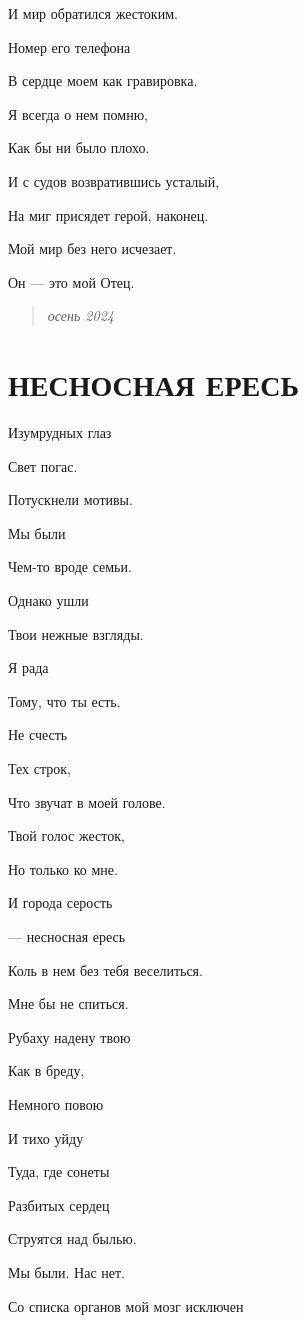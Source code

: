 \documentclass[
  a5paperpaper,
  DIV=11,
  numbers=noendperiod]{scrreprt}
\begin{document}
И мир обратился жестоким.

Номер его телефона

В сердце моем как гравировка.

Я всегда о нем помню,

Как бы ни было плохо.

И с судов возвратившись усталый,

На миг присядет герой, наконец.

Мой мир без него исчезает.

Он --- это мой Отец.

\begin{quote}
\emph{осень 2024}
\end{quote}

\section{НЕСНОСНАЯ
ЕРЕСЬ}\label{ux43dux435ux441ux43dux43eux441ux43dux430ux44f-ux435ux440ux435ux441ux44c}

Изумрудных глаз

Свет погас.

Потускнели мотивы.

Мы были

Чем-то вроде семьи.

Однако ушли

Твои нежные взгляды.

Я рада

Тому, что ты есть.

Не счесть

Тех строк,

Что звучат в моей голове.

Твой голос жесток,

Но только ко мне.

И города серость

--- несносная ересь

Коль в нем без тебя веселиться.

Мне бы не спиться.

Рубаху надену твою

Как в бреду,

Немного повою

И тихо уйду

Туда, где сонеты

Разбитых сердец

Струятся над былью.

Мы были. Нас нет.

Со списка органов мой мозг исключен
\end{document}
